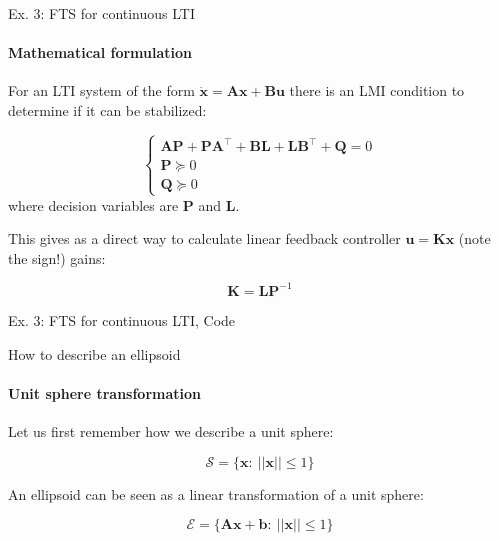 \documentclass{beamer}
\begin{document}
\begin{frame}{Ex. 3: FTS for continuous LTI}
\framesubtitle{Mathematical formulation}
\begin{flushleft}

For an LTI system of the form $\dot{\mathbf{x}} = \mathbf{A}\mathbf{x} + \mathbf{B}\mathbf{u}$ there is an LMI condition to determine if it can be stabilized:

\begin{equation}
    \begin{cases}
        \mathbf{A}\mathbf{P} + \mathbf{P}\mathbf{A}^\top + \mathbf{B}\mathbf{L} + \mathbf{L}\mathbf{B}^\top + \mathbf{Q} = 0 \\
        \mathbf{P} \succeq 0 \\
        \mathbf{Q} \succeq 0 
    \end{cases}
\end{equation}
%
where decision variables are $\mathbf{P}$ and $\mathbf{L}$. 

\bigskip

This gives as a direct way to calculate linear feedback controller $\mathbf{u} = \mathbf{K}\mathbf{x}$ (note the sign!) gains:

\begin{equation}
    \mathbf{K} = \mathbf{L}\mathbf{P}^{-1}
\end{equation}

\end{flushleft}
\end{frame}




\begin{frame}{Ex. 3: FTS for continuous LTI, Code}
\begin{flushleft}



\end{flushleft}
\end{frame}






\begin{frame}{How to describe an ellipsoid}
\framesubtitle{Unit sphere transformation}
\begin{flushleft}

Let us first remember how we describe a unit sphere:

\begin{equation}
    \mathcal{S} = \{ \mathbf{x}: \ || \mathbf{x} || \leq 1 \}
\end{equation}

An ellipsoid can be seen as a linear transformation of a unit sphere: 

\begin{equation}
    \mathcal{E} = \{ \mathbf{A}\mathbf{x} + \mathbf{b}: \ || \mathbf{x} || \leq 1 \}
\end{equation}
 
\end{flushleft}
\end{frame}
\end{document}
